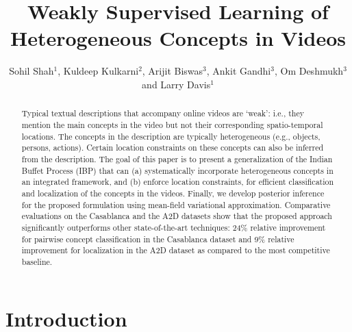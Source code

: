 \documentclass[runningheads]{llncs}
\begin{document}
\pagestyle{headings}
\mainmatter
\def\ECCV16SubNumber{1194}  %

\title{Weakly Supervised Learning of Heterogeneous Concepts in Videos} %



\author{Sohil Shah$^1$, Kuldeep Kulkarni$^2$, Arijit Biswas$^3$, Ankit Gandhi$^3$, Om Deshmukh$^3$ and Larry Davis$^1$}


\maketitle

\begin{abstract}
Typical textual descriptions that accompany online videos are `weak': i.e., they mention the main concepts in the video but not their corresponding spatio-temporal locations. The concepts in the description are typically heterogeneous (e.g., objects, persons, actions). Certain location constraints on these concepts can also be inferred from the description. The goal of this paper is to present a generalization of the Indian Buffet Process (IBP) that can (a) systematically incorporate heterogeneous concepts in an integrated framework, and (b) enforce location constraints, for efficient classification and localization of the concepts in the videos. Finally, we develop posterior inference for the proposed formulation using mean-field variational approximation. Comparative evaluations on the Casablanca and the A2D datasets show that the proposed approach significantly outperforms other state-of-the-art techniques: 24\% relative improvement for pairwise concept classification in the Casablanca dataset and 9\% relative improvement for localization in the A2D dataset as compared to the most competitive baseline.  
\end{abstract}


\section{Introduction}
\label{sec:introduction}
\end{document}
